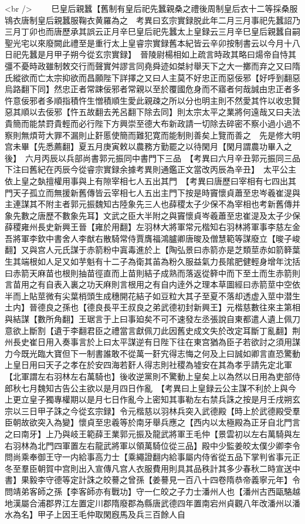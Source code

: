 <br />
　　巳皇后親蠶【舊制有皇后祀先蠶親桑之禮後周制皇后衣十二等採桑服鴇衣唐制皇后親蠶服鞠衣黄羅為之　考異曰玄宗實録脱此年二月三月事祀先蠶詔乃三月丁卯也而唐歷承其誤云正月辛巳皇后祀先蠶太上皇録云三月辛巳皇后親蠶自嗣聖光宅以來廢闕此禮至是重行太上皇睿宗實録舊本紀皆云辛卯按制書云以今月十八日祀先蠶是月甲子朔今從玄宗實録】　晉陵尉楊相如上疏言時政其略曰煬帝自恃其彊不憂時政雖制敇交行而聲實舛謬言同堯舜迹如桀紂舉天下之大一擲而弃之又曰隋氏縱欲而亡太宗抑欲而昌願陛下詳擇之又曰人主莫不好忠正而惡佞邪【好呼到翻惡烏路翻下同】然忠正者常踈佞邪者常親以至於覆國危身而不寤者何哉誠由忠正者多忤意佞邪者多順指積忤生憎積順生愛此親疎之所以分也明主則不然愛其忤以收忠賢惡其順以去佞邪【忤五故翻去羌呂翻下除去同】則太宗太平之業將何遠哉又曰夫法貴簡而能禁罸貴輕而必行陛下方興崇至德大布新政請一切除去碎密不察小過小過不察則無煩苛大罪不漏則止姧慝使簡而難犯寛而能制則善矣上覽而善之　先是修大明宫未畢【先悉薦翻】夏五月庚寅敕以農務方勤罷之以待閑月【閑月謂農功畢入之後】　六月丙辰以兵部尚書郭元振同中書門下三品　【考異曰六月辛丑郭元振同三品下注曰舊紀在丙辰今從睿宗實録余據考異則通鑑正文當改丙辰為辛丑】　太平公主依上皇之埶擅權用事與上有隙宰相七人五出其門　【考異曰唐歷曰宰相有七四出其門天子孤立而無援新舊傳皆云宰相七人五出主門下按是時竇懷貞蕭至忠岑羲崔湜與主連謀其不附主者郭元振魏知古陸象先三人也薛稷太子少保不為宰相也考新舊傳并象先數之唐歷不數象先耳】文武之臣大半附之與竇懷貞岑羲蕭至忠崔湜及太子少保薛稷雍州長史新興王晉【雍於用翻】左羽林大將軍常元楷知右羽林將軍事李慈左金吾將軍李欽中書舍人李猷右散騎常侍賈膺福鴻臚卿唐晙及僧慧範等謀廢立【晙子峻翻】又與宫人元氏謀于赤箭粉中寘毒進於上【陶弘景曰赤箭亦是芝類莖赤如箭簳葉生其端根如人足又如芋魁有十二子為衛其苖為粉久服益氣力長隂肥健輕身增年沈括曰赤箭天麻苗也根則抽苗徑直而上苗則結子成熟而落返從簳中而下至土而生赤箭則言苗用之有自表入裏之功天麻則言根用之有自内逹外之理本草圖經曰赤箭莖中空依半而上貼莖微有尖葉梢頭生成穗開花結子如豆粒大其子至夏不落却透虚入莖中潜生土内】晉德良之孫也【德良長平王叔良之弟武德初封新興王】元楷慈數往來主第相與結謀【數所角翻】王琚言于上曰事廹矣不可不速發左丞張說自東都遣人遺上佩刀意欲上斷割【遺于李翻君臣之禮當言獻佩刀此因舊史成文失於改定耳斷丁亂翻】荆州長史崔日用入奏事言於上曰太平謀逆有日陛下往在東宫猶為臣子若欲討之須用謀力今既光臨大寶但下一制書誰敢不從萬一姧宄得志悔之何及上曰誠如卿言直恐驚動上皇日用曰天子之孝在於安四海若姧人得志則社稷為墟安在其為孝乎請先定北軍【北軍謂左右羽林左右萬騎也】後收逆黨則不驚動上皇矣上以為然以日用為吏部侍郎秋七月魏知古告公主欲以是月四日作亂　【考異曰上皇録云公主謀不利於上與今上更立皇子獨專權期以是月七日作亂今上密知其事勒左右禁兵誅之按是月壬戌朔玄宗以三日甲子誅之今從玄宗録】令元楷慈以羽林兵突入武德殿【時上於武德殿受羣臣朝故欲突入為變】懷貞至忠羲等於南牙舉兵應之【西内以太極殿為正牙自北門言之曰南牙】上乃與岐王範薛王業郭元振及龍武將軍王毛仲【景雲初以左右萬騎與左右羽林為北門四軍置左右龍武將軍以領萬騎位從三品】殿中少監姜皎太僕少卿李令問尚乘奉御王守一内給事高力士【乘繩證翻内給事屬内侍省從五品下掌判省事元正冬至羣臣朝賀中宫則出入宣傳凡宫人衣服費用則具其品秩計其多少春秋二時宣送中書】果毅李守德等定計誅之皎謩之曾孫【姜謩見一百八十四卷隋恭帝義寧元年】令問靖弟客師之孫【李客師亦有戰功】守一仁皎之子力士潘州人也【潘州古西甌駱越地漢屬合浦郡界江左置定川郡隋廢郡為縣唐武德四年置南宕州貞觀八年改潘州以潘水為名】甲子上因王毛仲取閑廐馬及兵三百餘人自